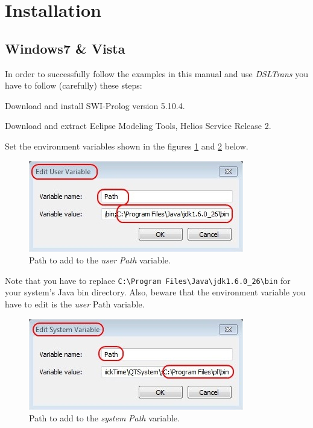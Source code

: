 ﻿\section{Installation}

\subsection{Windows7 \& Vista}

In order to successfully follow the examples in this manual and use
\emph{DSLTrans} you have to follow (carefully) these steps:

Download and install SWI-Prolog version 5.10.4.

Download and extract Eclipse Modeling Tools, Helios Service Release 2.

Set the environment variables shown in the figures \ref{fig:path_user}
and \ref{fig:path_system} below.

\begin{figure}[h]
\begin{center}
  \includegraphics[scale=0.9]{imgs/path_user.jpg}
  \caption{Path to add to the \emph{user} \emph{Path} variable.}
  \label{fig:path_user}
\end{center}
\end{figure}

Note that you have to replace \verb=C:\Program Files\Java\jdk1.6.0_26\bin=
for your system's Java bin directory. Also, beware that the environment
variable you have to edit is the \emph{user} Path variable.

\begin{figure}[h]
\begin{center}
  \includegraphics[scale=0.9]{imgs/path_system.jpg}
  \caption{Path to add to the \emph{system} \emph{Path} variable.}
  \label{fig:path_system}
\end{center}
\end{figure}


